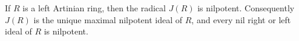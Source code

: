 If $R$ is a left Artinian ring, then the radical $J(R)$ is nilpotent. Consequently $J(R)$ is the unique maximal nilpotent ideal of $R$, and every nil right or left ideal of $R$ is nilpotent.
